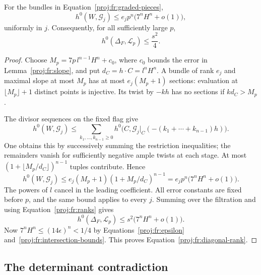 \begin{lemma}
\label{proj:fr:sections}
For the bundles in Equation~\eqref{proj:fr:graded-pieces},
\[
 h^0(W,\mathcal G_j)
      \leq e_jp^n\bigl(7^nH^n+o(1)\bigr),
\]
uniformly in \(j\). Consequently, for all sufficiently large \(p\),
\begin{equation}
\label{proj:fr:diagonal-rank}
 h^0(\Delta_F,\mathcal L_p)\leq\frac{s^2}{4}.
\end{equation}
\end{lemma}

\begin{proof}
Choose \(M_p=7p\,l^{n-1}H^n+c_0\), where \(c_0\) bounds the error in
Lemma~\ref{proj:fr:slope}, and put \(d_C=h\cdot C=l^nH^n\).
A bundle of rank \(e_j\) and maximal slope at most \(M_p\) has at
most \(e_j(M_p+1)\) sections: evaluation at
\(\lfloor M_p\rfloor+1\) distinct points is injective.
Its twist by \(-kh\) has no sections if \(kd_C>M_p\).

The divisor sequences on the fixed flag give
\[
 h^0(W,\mathcal G_j)
 \leq
 \sum_{k_1,\ldots,k_{n-1}\geq0}
 h^0\bigl(C,\mathcal G_j|_C
                    (-(k_1+\cdots+k_{n-1})h)\bigr).
\]
One obtains this by successively summing the restriction inequalities;
the remainders vanish for sufficiently negative ample twists at each
stage. At most
\((1+\lfloor M_p/d_C\rfloor)^{n-1}\) tuples contribute. Hence
\[
 h^0(W,\mathcal G_j)
 \leq e_j(M_p+1)(1+M_p/d_C)^{n-1}
 =e_jp^n\bigl(7^nH^n+o(1)\bigr).
\]
The powers of \(l\) cancel in the leading coefficient.
All error constants are fixed before \(p\), and the same bound applies
to every \(j\). Summing over the filtration and using
Equation~\eqref{proj:fr:ranks} gives
\[
 h^0(\Delta_F,\mathcal L_p)
 \leq s^2\bigl(7^nH^n+o(1)\bigr).
\]
Now \(7^nH^n\leq(14\epsilon)^n<1/4\) by
Equations~\eqref{proj:fr:epsilon} and~\eqref{proj:fr:intersection-bounds}.
This proves Equation~\eqref{proj:fr:diagonal-rank}.
\end{proof}

\subsection{The determinant contradiction}

